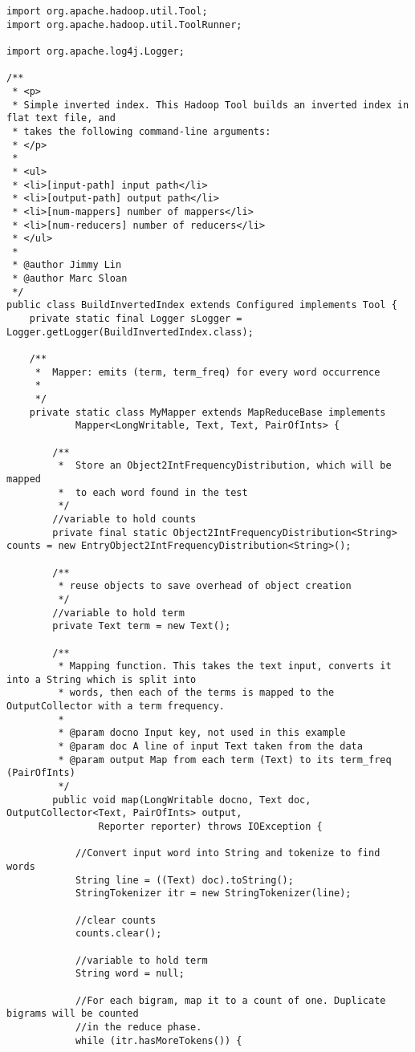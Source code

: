 \documentclass{article} %
\begin{document}
\begin{lstlisting}[style=Java]
import org.apache.hadoop.util.Tool;
import org.apache.hadoop.util.ToolRunner;

import org.apache.log4j.Logger;

/**
 * <p>
 * Simple inverted index. This Hadoop Tool builds an inverted index in flat text file, and
 * takes the following command-line arguments:
 * </p>
 * 
 * <ul>
 * <li>[input-path] input path</li>
 * <li>[output-path] output path</li>
 * <li>[num-mappers] number of mappers</li>
 * <li>[num-reducers] number of reducers</li>
 * </ul>
 * 
 * @author Jimmy Lin
 * @author Marc Sloan
 */
public class BuildInvertedIndex extends Configured implements Tool {
	private static final Logger sLogger = Logger.getLogger(BuildInvertedIndex.class);

	/**
	 *  Mapper: emits (term, term_freq) for every word occurrence
	 *
	 */
	private static class MyMapper extends MapReduceBase implements
			Mapper<LongWritable, Text, Text, PairOfInts> {

		/**
		 *  Store an Object2IntFrequencyDistribution, which will be mapped 
		 *  to each word found in the test
		 */
		//variable to hold counts
		private final static Object2IntFrequencyDistribution<String> counts = new EntryObject2IntFrequencyDistribution<String>();
		
		/**
		 * reuse objects to save overhead of object creation
		 */
		//variable to hold term
		private Text term = new Text();

		/**
		 * Mapping function. This takes the text input, converts it into a String which is split into 
		 * words, then each of the terms is mapped to the OutputCollector with a term frequency. 
		 * 
		 * @param docno Input key, not used in this example
		 * @param doc A line of input Text taken from the data
		 * @param output Map from each term (Text) to its term_freq (PairOfInts)
		 */
		public void map(LongWritable docno, Text doc, OutputCollector<Text, PairOfInts> output,
				Reporter reporter) throws IOException {
			
			//Convert input word into String and tokenize to find words
			String line = ((Text) doc).toString();
			StringTokenizer itr = new StringTokenizer(line);
			
			//clear counts
			counts.clear();
			
			//variable to hold term
			String word = null;
			
			//For each bigram, map it to a count of one. Duplicate bigrams will be counted 
			//in the reduce phase.
			while (itr.hasMoreTokens()) {
				

\end{lstlisting}
\end{document}
